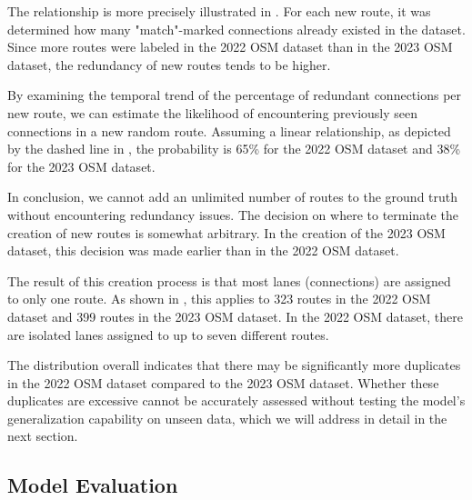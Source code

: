The relationship is more precisely illustrated in . For each new route, it was determined how many "match"-marked connections already existed in the dataset. Since more routes were labeled in the 2022 OSM dataset than in the 2023 OSM dataset, the redundancy of new routes tends to be higher.

By examining the temporal trend of the percentage of redundant connections per new route, we can estimate the likelihood of encountering previously seen connections in a new random route. Assuming a linear relationship, as depicted by the dashed line in , the probability is 65\% for the 2022 OSM dataset and 38\% for the 2023 OSM dataset.

In conclusion, we cannot add an unlimited number of routes to the ground truth without encountering redundancy issues. The decision on where to terminate the creation of new routes is somewhat arbitrary. In the creation of the 2023 OSM dataset, this decision was made earlier than in the 2022 OSM dataset.

The result of this creation process is that most lanes (connections) are assigned to only one route. As shown in , this applies to 323 routes in the 2022 OSM dataset and 399 routes in the 2023 OSM dataset. In the 2022 OSM dataset, there are isolated lanes assigned to up to seven different routes.

The distribution overall indicates that there may be significantly more duplicates in the 2022 OSM dataset compared to the 2023 OSM dataset. Whether these duplicates are excessive cannot be accurately assessed without testing the model's generalization capability on unseen data, which we will address in detail in the next section.

\subsection{Model Evaluation}

\begin{table}[h]
\caption{Tuned hyperparameters for the algorithmic matching model.}
\label{tab:hyperparameter-tuning-results}
\end{table}

